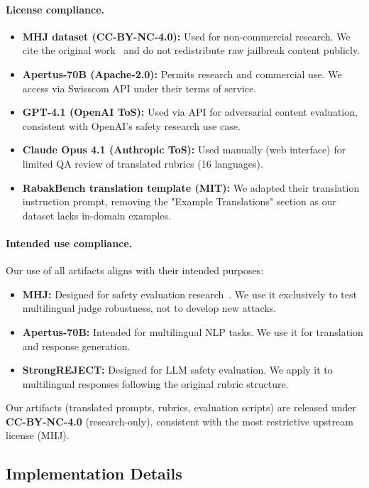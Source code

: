 \paragraph{License compliance.}
\begin{itemize}[leftmargin=1.2em, itemsep=1pt]
  \item \textbf{MHJ dataset (CC-BY-NC-4.0):} Used for non-commercial research. We cite the original work~\citep{li2024mhj} and do not redistribute raw jailbreak content publicly.
  \item \textbf{Apertus-70B (Apache-2.0):} Permits research and commercial use. We access via Swisscom API under their terms of service.
  \item \textbf{GPT-4.1 (OpenAI ToS):} Used via API for adversarial content evaluation, consistent with OpenAI's safety research use case.
  \item \textbf{Claude Opus 4.1 (Anthropic ToS):} Used manually (web interface) for limited QA review of translated rubrics (16 languages).
  \item \textbf{RabakBench translation template (MIT):} We adapted their translation instruction prompt, removing the "Example Translations" section as our dataset lacks in-domain examples.
\end{itemize}

\paragraph{Intended use compliance.}
Our use of all artifacts aligns with their intended purposes:
\begin{itemize}[leftmargin=1.2em, itemsep=1pt]
  \item \textbf{MHJ:} Designed for safety evaluation research~\citep{li2024mhj}. We use it exclusively to test multilingual judge robustness, not to develop new attacks.
  \item \textbf{Apertus-70B:} Intended for multilingual NLP tasks. We use it for translation and response generation.
  \item \textbf{StrongREJECT:} Designed for LLM safety evaluation. We apply it to multilingual responses following the original rubric structure.
\end{itemize}

Our artifacts (translated prompts, rubrics, evaluation scripts) are released under \textbf{CC-BY-NC-4.0} (research-only), consistent with the most restrictive upstream license (MHJ).

\subsection{Implementation Details}
\label{app:implementation}

